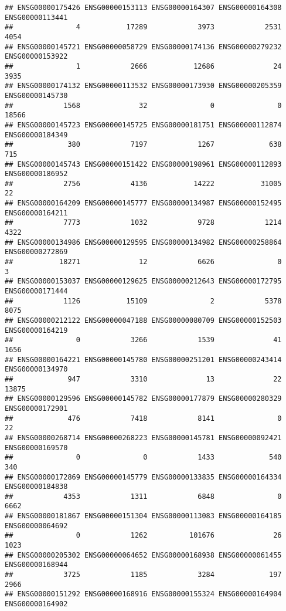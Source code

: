 \documentclass[
]{article}
\begin{document}
\begin{verbatim}
## ENSG00000175426 ENSG00000153113 ENSG00000164307 ENSG00000164308 ENSG00000113441 
##               4           17289            3973            2531            4054 
## ENSG00000145721 ENSG00000058729 ENSG00000174136 ENSG00000279232 ENSG00000153922 
##               1            2666           12686              24            3935 
## ENSG00000174132 ENSG00000113532 ENSG00000173930 ENSG00000205359 ENSG00000145730 
##            1568              32               0               0           18566 
## ENSG00000145723 ENSG00000145725 ENSG00000181751 ENSG00000112874 ENSG00000184349 
##             380            7197            1267             638             715 
## ENSG00000145743 ENSG00000151422 ENSG00000198961 ENSG00000112893 ENSG00000186952 
##            2756            4136           14222           31005              22 
## ENSG00000164209 ENSG00000145777 ENSG00000134987 ENSG00000152495 ENSG00000164211 
##            7773            1032            9728            1214            4322 
## ENSG00000134986 ENSG00000129595 ENSG00000134982 ENSG00000258864 ENSG00000272869 
##           18271              12            6626               0               3 
## ENSG00000153037 ENSG00000129625 ENSG00000212643 ENSG00000172795 ENSG00000171444 
##            1126           15109               2            5378            8075 
## ENSG00000212122 ENSG00000047188 ENSG00000080709 ENSG00000152503 ENSG00000164219 
##               0            3266            1539              41            1656 
## ENSG00000164221 ENSG00000145780 ENSG00000251201 ENSG00000243414 ENSG00000134970 
##             947            3310              13              22           13875 
## ENSG00000129596 ENSG00000145782 ENSG00000177879 ENSG00000280329 ENSG00000172901 
##             476            7418            8141               0              22 
## ENSG00000268714 ENSG00000268223 ENSG00000145781 ENSG00000092421 ENSG00000169570 
##               0               0            1433             540             340 
## ENSG00000172869 ENSG00000145779 ENSG00000133835 ENSG00000164334 ENSG00000184838 
##            4353            1311            6848               0            6662 
## ENSG00000181867 ENSG00000151304 ENSG00000113083 ENSG00000164185 ENSG00000064692 
##               0            1262          101676              26            1023 
## ENSG00000205302 ENSG00000064652 ENSG00000168938 ENSG00000061455 ENSG00000168944 
##            3725            1185            3284             197            2966 
## ENSG00000151292 ENSG00000168916 ENSG00000155324 ENSG00000164904 ENSG00000164902 

\end{verbatim}
\end{document}
